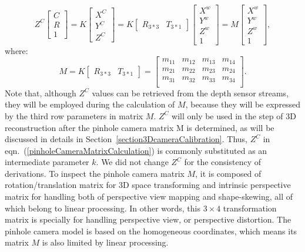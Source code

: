 \begin{equation}
Z^C\left[ \begin{array}{c} C \\ R \\ 1 \end{array} \right] %
=K \left[ \begin{array}{c} X^C \\ Y^C \\ Z^C\end{array} \right]%
=K\begin{bmatrix} R_{3*3} & T_{3*1} \end{bmatrix} \left[ \begin{array}{c} X^w \\ Y^w \\ Z^w \\ 1 \end{array} \right]%
=M \left[ \begin{array}{c} X^w \\ Y^w \\ Z^w \\ 1 \end{array} \right]%
 , %
\label{pinholeCameraMatrixCalculation}
\end{equation}%
\noindent
where: %
\begin{equation}
M = K\begin{bmatrix} R_{3*3} & T_{3*1} \end{bmatrix}%
= \begin{bmatrix} 
m_{11} & m_{12} & m_{13} & m_{14} \\
m_{21} & m_{22} & m_{23} & m_{24} \\
m_{31} & m_{32} & m_{33} & m_{34} \\
\end{bmatrix} . %
\label{pinholeMatrix3x4M}
\end{equation}%
%
\noindent
Note that, although \(Z^C\) values can be retrieved from the depth sensor streams, they will be employed during the calculation of \(M\), because they will be expressed by the third row parameters in matrix \(M\). \(Z^C\) will only be used in the step of 3D reconstruction after the pinhole camera matrix M is determined, as will be discussed in details in Section~\ref{section3DcameraCalibration}. Thus, \(Z^C\) in eqn.~(\ref{pinholeCameraMatrixCalculation}) is commonly substituted as an intermediate parameter \(k\). We did not change \(Z^C\) for the consistency of derivations.
To inspect the pinhole camera matrix \(M\), it is composed of rotation/translation matrix for 3D space transforming and intrinsic perspective matrix for handling both of perspective view mapping and shape-skewing, all of which belong to linear processing. In other words, this $3\times4$ transformation matrix is specially for handling perspective view, or perspective distortion. The pinhole camera model is based on the homogeneous coordinates, which means its matrix \(M\) is also limited by linear processing.

